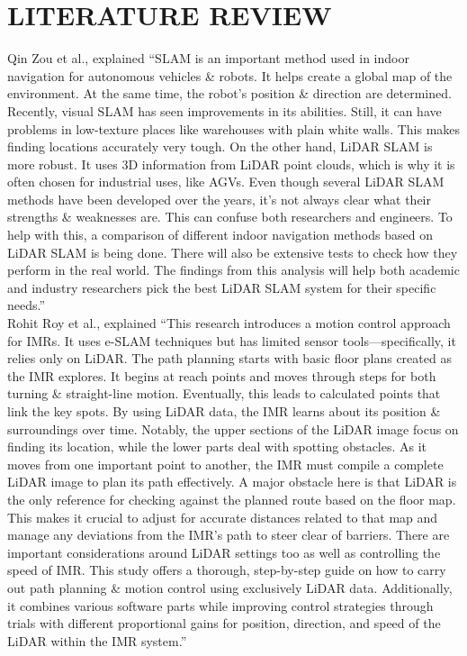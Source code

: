 \newpage

\pagestyle{fancy}
\fancyhf{}
\fancyhead[L]{{\footnotesize \textbf{\shortprojname}}\hfill{\footnotesize \leftmark}}
\fancyfoot[C]{\hfill\thepage\hfill}

	
\fontsize{16}{18} \chapter{LITERATURE REVIEW} \label{chap:LitRev}
	{
		\fontsize{12}{14}	
		Qin Zou et al., explained “SLAM is an important method used in indoor navigation for
		autonomous vehicles \& robots. It helps create a global map of the environment. At the same
		time, the robot’s position \& direction are determined. Recently, visual SLAM has seen
		improvements in its abilities. Still, it can have problems in low-texture places like warehouses
		with plain white walls. This makes finding locations accurately very tough. On the other hand,
		LiDAR SLAM is more robust. It uses 3D information from LiDAR point clouds, which is why
		it is often chosen for industrial uses, like AGVs. Even though several LiDAR SLAM methods
		have been developed over the years, it’s not always clear what their strengths \& weaknesses
		are. This can confuse both researchers and engineers. To help with this, a comparison of
		different indoor navigation methods based on LiDAR SLAM is being done. There will also be
		extensive tests to check how they perform in the real world. The findings from this analysis
		will help both academic and industry researchers pick the best LiDAR SLAM system for their
		specific needs.” \cite{9381521}\\
		
		Rohit Roy et al., explained “This research introduces a motion control approach for IMRs. It uses e-SLAM techniques but has limited sensor tools—specifically, it relies only on LiDAR. The path planning starts with basic floor plans created as the IMR explores. It begins at reach points and moves through steps for both turning \& straight-line motion. Eventually,  this leads to calculated points that link the key spots. By using LiDAR data, the IMR learns about its position \& surroundings over time. Notably, the upper sections of the LiDAR image focus on finding its location, while the lower parts deal with spotting obstacles. As it moves from one important point to another, the IMR must compile a complete LiDAR image to plan its path 	effectively. A major obstacle here is that LiDAR is the only reference for checking against the planned route based on the floor map. This makes it crucial to adjust for accurate distances related to that map and manage any deviations from the IMR's path to steer clear of barriers. There are important considerations around LiDAR settings too as well as controlling the speed of IMR. This study offers a thorough, step-by-step guide on how to carry out path planning \& motion control using exclusively LiDAR data. Additionally, it combines various software parts while improving control strategies through trials with different proportional gains for position, direction, and speed of the LiDAR within the IMR system.” \cite{23073606} \\
		
}
